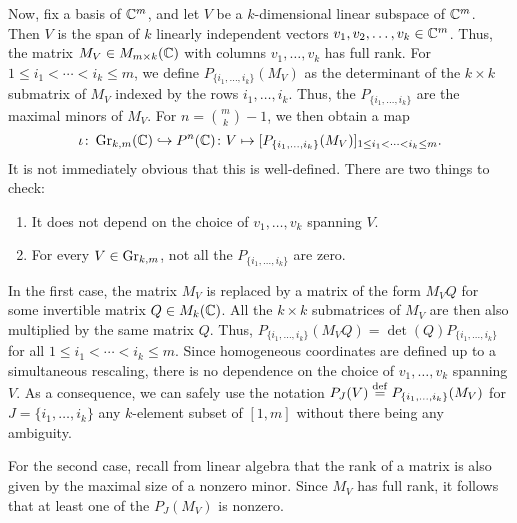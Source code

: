 Now, fix a basis of $\mathbb{C}^m$, and let $V$ be a $k$-dimensional linear subspace of
$\mathbb{C}^m$. Then $V$ is the span of $k$ linearly independent vectors $v_1, v_2, \dots,
	v_k \in \mathbb{C}^m$. Thus, the matrix $M_V \in M_{m \times k}(\mathbb{C})$ with columns $v_1,
	\dots, v_k$ has full rank. For $1 \leq i_1 < \dotsb < i_k \leq m$, we define $P_{\{i_1,
			\dots, i_k\}}(M_V)$ as the determinant of the $k \times k$ submatrix of $M_V$ indexed
by the rows $i_1, \dots, i_k$. Thus, the $P_{\{i_1, \dots, i_k\}}$ are the maximal
minors of $M_V$. For $n = \binom{m}{k} - 1$, we then obtain a map
\begin{equation*}
	\iota \colon \operatorname{Gr}_{k, m}(\mathbb{C}) \hookrightarrow P^n(\mathbb{C}) \colon V \mapsto [P_{\{i_1, \dotsc, i_k\}}(M_V)]_{1 \leq i_1 < \cdots < i_k \leq m}.
\end{equation*}
%
It is not immediately obvious that this is well-defined. There are two things to check:
\begin{enumerate}
	\item It does not depend on the choice of $v_1, \dots, v_k$ spanning $V$.
	\item For every $V \in \operatorname{Gr}_{k, m}$, not all the $P_{\{i_1, \dots, i_k\}}$ are zero.
\end{enumerate}

In the first case, the matrix $M_V$ is replaced by a matrix of the form $M_V Q$ for
some invertible matrix $Q \in M_k(\mathbb{C})$. All the $k \times k$ submatrices of $M_V$ are
then also multiplied by the same matrix $Q$. Thus, $P_{\{i_1, \dots, i_k\}}(M_V Q) =
	\det(Q) P_{\{i_1, \dots, i_k\}}$ for all $1 \leq i_1 < \dotsb < i_k \leq m$. Since
homogeneous coordinates are defined up to a simultaneous rescaling, there is no
dependence on the choice of $v_1, \dotsc,v_k$ spanning $V$. As a consequence, we can
safely use the notation $P_J (V) \overset{\mathrm{def}}{=} P_{\{i_1, \dotsc, i_k\}} (M_V)$ for $J = \{i_1,
	\dotsc, i_k\}$ any $k$-element subset of $[1, m]$ without there being any ambiguity.

For the second case, recall from linear algebra that the rank of a matrix is also given
by the maximal size of a nonzero minor. Since $M_V$ has full rank, it follows that at
least one of the $P_J(M_V)$ is nonzero.

